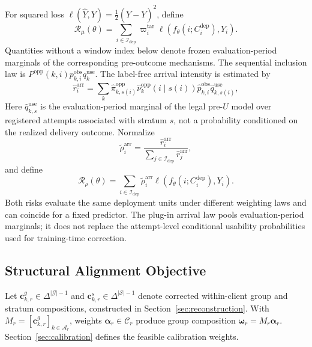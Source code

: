 \documentclass[letterpaper,journal]{IEEEtran}
\begin{document}
For squared loss $\ell(\widehat Y,Y)=\tfrac12(\widehat Y-Y)^2$, define
\begin{equation}
 \mathcal{R}_{\mu}(\theta)
 =
 \sum_{i\in\mathcal{I}_{\mathrm{dep}}}
 \varpi_i^{\mathrm{tar}}
 \ell\!\left(
 f_{\theta}(i;C_i^{\mathrm{dep}}),Y_i
 \right).
 \label{eq:target_risk}
\end{equation}
Quantities without a window index below denote frozen evaluation-period
marginals of the corresponding pre-outcome mechanisms.  The sequential
inclusion law is $P^{\mathrm{opp}}(k,i)p^{\mathrm{obs}}_{k,i}q^{\mathrm{use}}_k$.
The label-free arrival intensity is estimated by
\begin{equation}
 \widehat r_i^{\mathrm{arr}}
 =
 \sum_k
 \widehat\pi^{\mathrm{opp}}_{k,s(i)}
 \widehat\nu^{\mathrm{opp}}_{k}(i\mid s(i))
 \widehat p^{\mathrm{obs}}_{k,i}
 \widehat q^{\mathrm{use}}_{k,s(i)},
 \label{eq:arrival_intensity}
\end{equation}
Here $\widehat q^{\mathrm{use}}_{k,s}$ is the evaluation-period marginal of
the legal pre-$U$ model over registered attempts associated with stratum $s$,
not a probability conditioned on the realized delivery outcome.  Normalize
\begin{equation}
 \widetilde\rho_i^{\mathrm{arr}}
 =
 \frac{\widehat r_i^{\mathrm{arr}}}
 {\sum_{j\in\mathcal{I}_{\mathrm{dep}}}\widehat r_j^{\mathrm{arr}}},
 \label{eq:arrival_distribution}
\end{equation}
and define
\begin{equation}
 \mathcal{R}_{\rho}(\theta)
 =
 \sum_{i\in\mathcal{I}_{\mathrm{dep}}}
 \widetilde\rho_i^{\mathrm{arr}}
 \ell\!\left(
 f_{\theta}(i;C_i^{\mathrm{dep}}),Y_i
 \right).
 \label{eq:arrival_risk}
\end{equation}
Both risks evaluate the same deployment units under different weighting laws
and can coincide for a fixed predictor. The plug-in arrival law pools
evaluation-period marginals; it does not replace the attempt-level conditional
usability probabilities used for training-time correction.

\subsection{Structural Alignment Objective}
\label{subsec:design_objective}

Let $\mathbf c^g_{k,r}\in\Delta^{|\mathcal G|-1}$ and
$\mathbf c^s_{k,r}\in\Delta^{|\mathcal S|-1}$ denote corrected within-client
group and stratum compositions, constructed in Section~\ref{sec:reconstruction}.
With $M_r=[\mathbf c^g_{k,r}]_{k\in\mathcal A_r}$, weights
$\boldsymbol\alpha_r\in\mathcal C_r$ produce group composition
$\boldsymbol\omega_r=M_r\boldsymbol\alpha_r$.
Section~\ref{sec:calibration} defines the feasible calibration weights.
\end{document}
